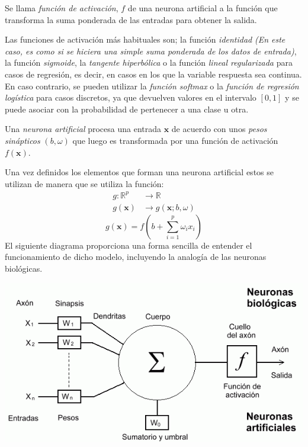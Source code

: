 \begin{defi}
Se llama \emph{función de activación}, $f$ de una neurona artificial a la función que transforma la suma ponderada de las entradas para obtener la salida. 

\noindent Las funciones de activación más habituales son; la función \emph{identidad} \emph{(En este caso, es como si se hiciera una simple suma ponderada de los datos de entrada)}, la función \emph{sigmoide}, la \emph{tangente hiperbólica} o la función \emph{lineal regularizada} para casos de regresión, es decir, en casos en los que la variable respuesta sea continua. En caso contrario, se pueden utilizar la \emph{función softmax} o la \emph{función de regresión logística} para casos discretos, ya que devuelven valores en el intervalo $[0,1]$ y se puede asociar con la probabilidad de pertenecer a una clase u otra. 
\end{defi}
\begin{defi}
Una \emph{neurona artificial} procesa una entrada $\textbf{x}$ de acuerdo con unos \emph{pesos sinápticos} $(b,\omega)$ que luego es transformada por una función de activación $f(\mathbf{x})$.

\noindent Una  vez definidos los elementos que forman una neurona artificial estos se utilizan de manera que se utiliza la función:
\begin{equation}
\begin{split}
g:\mathbb{R}^p &\longrightarrow \mathbb{R}\\
g(\textbf{x})&\longrightarrow g(\textbf{x};b,\omega)
\end{split}
\end{equation}
\begin{equation}
g(\textbf{x})=f\left(b+\sum_{i=1}^p \omega_i x_i\right)
\end{equation}
El siguiente diagrama proporciona una forma sencilla de entender el funcionamiento de dicho modelo, incluyendo la analogía de las neuronas biológicas. 
\end{defi}
\begin{center}
\includegraphics[scale=0.6]{Documentos Extra/Imagenes/neurona.png}
\end{center}

